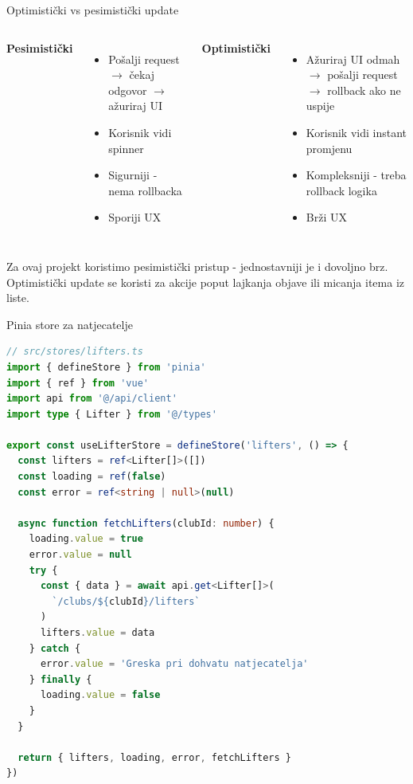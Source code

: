 \begin{frame}{Optimistički vs pesimistički update}
\begin{columns}[T]
\textbf{Pesimistički}
\begin{itemize}
  \item Pošalji request $\rightarrow$ čekaj odgovor $\rightarrow$ ažuriraj UI
  \item Korisnik vidi spinner
  \item Sigurniji - nema rollbacka
  \item Sporiji UX
\end{itemize}

\textbf{Optimistički}
\begin{itemize}
  \item Ažuriraj UI odmah $\rightarrow$ pošalji request $\rightarrow$ rollback ako ne uspije
  \item Korisnik vidi instant promjenu
  \item Kompleksniji - treba rollback logika
  \item Brži UX
\end{itemize}
\end{columns}

\vspace{0.6em}
Za ovaj projekt koristimo pesimistički pristup - jednostavniji je i dovoljno brz. Optimistički update se koristi za akcije poput lajkanja objave ili micanja itema iz liste.
\end{frame}

\begin{frame}[fragile,shrink=5]{Pinia store za natjecatelje}
\begin{lstlisting}[language=typescript]
// src/stores/lifters.ts
import { defineStore } from 'pinia'
import { ref } from 'vue'
import api from '@/api/client'
import type { Lifter } from '@/types'

export const useLifterStore = defineStore('lifters', () => {
  const lifters = ref<Lifter[]>([])
  const loading = ref(false)
  const error = ref<string | null>(null)

  async function fetchLifters(clubId: number) {
    loading.value = true
    error.value = null
    try {
      const { data } = await api.get<Lifter[]>(
        `/clubs/${clubId}/lifters`
      )
      lifters.value = data
    } catch {
      error.value = 'Greska pri dohvatu natjecatelja'
    } finally {
      loading.value = false
    }
  }

  return { lifters, loading, error, fetchLifters }
})
\end{lstlisting}
\end{frame}

